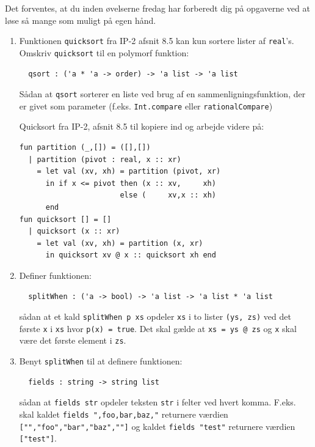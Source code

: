 \documentclass[a4paper,12pt]{article}
\begin{document}
Det forventes, at du inden øvelserne fredag har forberedt dig på
opgaverne ved at løse så mange som muligt på egen hånd.
\begin{enumerate}[{4}F1]
\item Funktionen \lstinline{quicksort} fra IP-2 afsnit 8.5 kan kun
  sortere lister af \lstinline{real}'s. Omskriv \lstinline{quicksort}
  til en polymorf funktion:
\begin{lstlisting}
  qsort : ('a * 'a -> order) -> 'a list -> 'a list
\end{lstlisting}

  Sådan at \lstinline{qsort} sorterer en liste ved brug af en
  sammenligningsfunktion, der er givet som parameter
  (f.eks. \lstinline{Int.compare} eller \lstinline{rationalCompare})

Quicksort fra IP-2, afsnit 8.5 til kopiere ind og arbejde videre på:
\begin{lstlisting}[basicstyle=\scriptsize\ttfamily,escapechar=£]
fun partition (_,[]) = ([],[])
  | partition (pivot : real, x :: xr)
    = let val (xv, xh) = partition (pivot, xr)
      in if x <= pivot then (x :: xv,     xh)
                       else (     xv,x :: xh)
      end
fun quicksort [] = []
  | quicksort (x :: xr)
    = let val (xv, xh) = partition (x, xr)
      in quicksort xv @ x :: quicksort xh end
\end{lstlisting}

\item Definer funktionen:
\begin{lstlisting}
  splitWhen : ('a -> bool) -> 'a list -> 'a list * 'a list
\end{lstlisting}
  sådan at et kald \lstinline{splitWhen p xs} opdeler \lstinline{xs}
  i to lister \lstinline{(ys, zs)} ved det første \lstinline{x} i
  \lstinline{xs} hvor \lstinline{p(x) = true}. Det skal gælde at
  \lstinline{xs = ys @ zs} og \lstinline{x} skal være det første
  element i \lstinline{zs}.

\item Benyt \lstinline{splitWhen} til at definere funktionen:
\begin{lstlisting}
  fields : string -> string list
\end{lstlisting}
  sådan at \lstinline{fields str} opdeler teksten \lstinline{str} i
  felter ved hvert komma. F.eks. skal kaldet \lstinline{fields ",foo,bar,baz,"} 
  returnere værdien \lstinline{["","foo","bar","baz",""]} og 
  kaldet \lstinline{fields "test"} returnere værdien \lstinline{["test"]}.
\end{enumerate}
\end{document}
